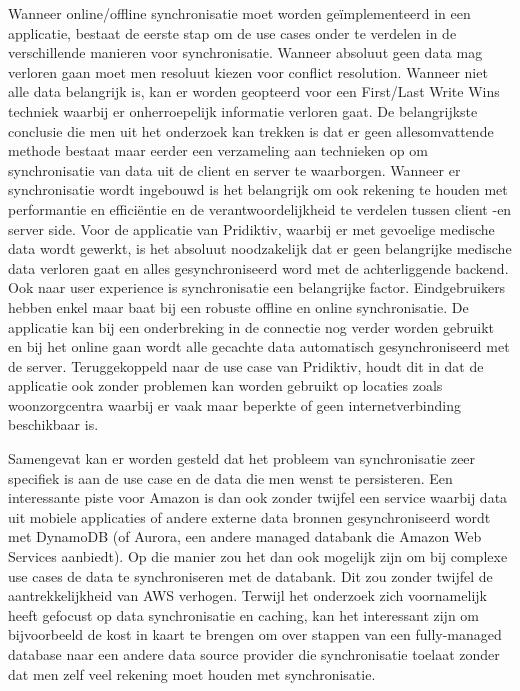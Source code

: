 Wanneer online/offline synchronisatie moet worden ge\"implementeerd in een applicatie,  bestaat de eerste stap om de use cases onder te verdelen in de verschillende manieren voor synchronisatie. Wanneer absoluut geen data mag verloren gaan moet men resoluut kiezen voor conflict resolution. Wanneer niet alle data belangrijk is, kan er worden geopteerd voor een First/Last Write Wins techniek waarbij er onherroepelijk informatie verloren gaat. De belangrijkste conclusie die men uit het onderzoek kan trekken is dat er geen allesomvattende methode bestaat maar eerder een verzameling aan technieken op om synchronisatie van data uit de client en server te waarborgen. Wanneer er  synchronisatie wordt ingebouwd is het belangrijk om ook rekening te houden met performantie en effici\"entie en de verantwoordelijkheid te verdelen tussen client -en server side. Voor de applicatie van Pridiktiv, waarbij er met gevoelige medische data wordt gewerkt, is het absoluut noodzakelijk dat er geen belangrijke medische data verloren gaat en alles gesynchroniseerd word met de achterliggende backend. Ook naar user experience is synchronisatie een belangrijke factor. Eindgebruikers hebben enkel maar baat bij een robuste offline en online synchronisatie. 
\clearpage
De applicatie kan bij een onderbreking in de connectie nog verder worden gebruikt en bij het online gaan wordt alle gecachte data automatisch gesynchroniseerd met de server. Teruggekoppeld naar de use case van Pridiktiv, houdt dit in dat de applicatie ook zonder problemen kan worden gebruikt op locaties zoals woonzorgcentra waarbij er vaak maar beperkte of geen internetverbinding beschikbaar is.

Samengevat kan er worden gesteld dat het probleem van synchronisatie zeer specifiek is aan de use case en de data  die men wenst te persisteren. Een interessante piste voor Amazon is dan ook zonder twijfel een service waarbij data uit mobiele applicaties of andere externe data bronnen gesynchroniseerd wordt met DynamoDB (of Aurora, een andere managed databank die Amazon Web Services aanbiedt). Op die manier zou het dan ook mogelijk zijn om bij complexe use cases de data te synchroniseren met de databank. Dit zou zonder twijfel de aantrekkelijkheid van AWS verhogen. Terwijl het onderzoek zich voornamelijk heeft gefocust op data synchronisatie en caching, kan het interessant zijn om bijvoorbeeld de kost in kaart te brengen om over stappen van een fully-managed database naar een andere data source provider die synchronisatie toelaat zonder dat men zelf veel rekening moet houden met synchronisatie.